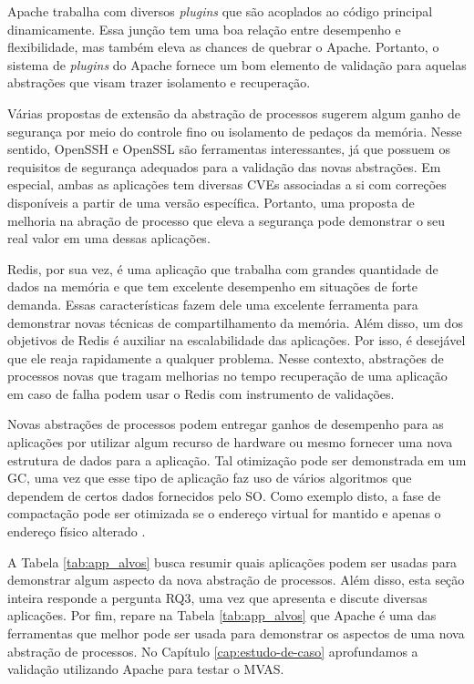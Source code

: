 Apache trabalha com diversos \emph{plugins} que são acoplados ao código
principal dinamicamente. Essa junção tem uma boa relação entre desempenho e
flexibilidade, mas também eleva as chances de quebrar o Apache.  Portanto, o
sistema de \emph{plugins} do Apache fornece um bom elemento de validação para
aquelas abstrações que visam trazer isolamento e recuperação.

Várias propostas de extensão da abstração de processos sugerem algum ganho de
segurança por meio do controle fino ou isolamento de pedaços da memória. Nesse
sentido, OpenSSH e OpenSSL são ferramentas interessantes, já que possuem os
requisitos de segurança adequados para a validação das novas abstrações. Em
especial, ambas as aplicações tem diversas CVEs associadas a si com correções
disponíveis a partir de uma versão específica. Portanto, uma proposta de
melhoria na abração de processo que eleva a segurança pode demonstrar o seu
real valor em uma dessas aplicações.

Redis, por sua vez, é uma aplicação que trabalha com grandes quantidade de
dados na memória e que tem excelente desempenho em situações de forte
demanda. Essas características fazem dele uma excelente ferramenta para
demonstrar novas técnicas de compartilhamento da memória. Além disso, um dos
objetivos de Redis é auxiliar na escalabilidade das aplicações. Por isso, é
desejável que ele reaja rapidamente a qualquer problema. Nesse contexto,
abstrações de processos novas que tragam melhorias no tempo recuperação de uma
aplicação em caso de falha podem usar o Redis com instrumento de validações.

Novas abstrações de processos podem entregar ganhos de desempenho para as
aplicações por utilizar algum recurso de hardware ou mesmo fornecer uma nova
estrutura de dados para a aplicação. Tal otimização pode ser demonstrada em um
GC, uma vez que esse tipo de aplicação faz uso de vários algoritmos que dependem
de certos dados fornecidos pelo SO. Como exemplo disto, a fase de compactação
pode ser otimizada se o endereço virtual for mantido e apenas o endereço físico
alterado \citep{pauseless}.

A Tabela \ref{tab:app_alvos} busca resumir quais aplicações podem ser usadas
para demonstrar algum aspecto da nova abstração de processos. Além disso, esta
seção inteira responde a pergunta RQ3, uma vez que apresenta e discute diversas
aplicações. Por fim, repare na Tabela \ref{tab:app_alvos} que Apache é uma das
ferramentas que melhor pode ser usada para demonstrar os aspectos de uma nova
abstração de processos. No Capítulo \ref{cap:estudo-de-caso} aprofundamos a
validação utilizando Apache para testar o MVAS.

